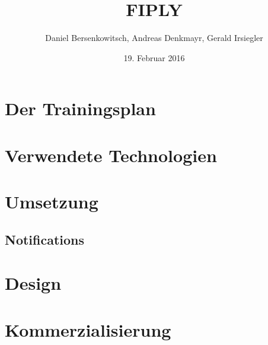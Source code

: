 \documentclass[a4paper, 12pt]{article}
\title{FIPLY}
\author{Daniel Bersenkowitsch, Andreas Denkmayr, Gerald Irsiegler}
\date{19. Februar 2016}
\begin{document}
\maketitle
\tableofcontents

\newpage %



\newpage %
\section{Der Trainingsplan}



\newpage %
\section{Verwendete Technologien}

\newpage


\newpage







\newpage %

\newpage



\newpage %
\section{Umsetzung}

\newpage

\newpage

\newpage

\newpage

\newpage

\newpage

\newpage

\newpage

\newpage

\newpage

\newpage

\newpage

\newpage
\subsection{Notifications}

\newpage



\newpage %
\section{Design} 



\newpage %
\section{Kommerzialisierung}
\newpage

\newpage

\newpage
 
\newpage
 
\newpage
 
\newpage

\newpage
 


\newpage
\printbibliography
\end{document}
